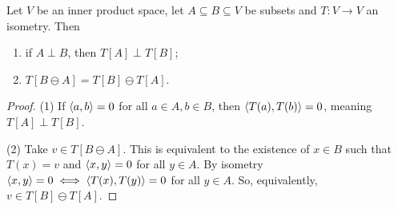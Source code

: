 \begin{proposition} \label{perpUnderIsometry}
Let $V$ be an inner product space, let $A\subseteq B\subseteq V$ be subsets and $T:V\to V$ an isometry. Then
\begin{enumerate}
\item if $A\perp B$, then $T[A]\perp T[B]$;
\item $T[B\ominus A] = T[B]\ominus T[A]$.
\end{enumerate}
\end{proposition}
\begin{proof}
(1) If $\inner{a,b}=0$ for all $a\in A, b\in B$, then $\inner{T(a), T(b)} =0$, meaning $T[A]\perp T[B]$.

(2) Take $v\in T[B\ominus A]$. This is equivalent to the existence of $x\in B$ such that $T(x) = v$ and $\inner{x,y}=0$ for all $y\in A$. By isometry $\inner{x,y}=0 \iff \inner{T(x), T(y)}=0$ for all $y\in A$. So, equivalently, $v\in T[B]\ominus T[A]$. 
\end{proof}

